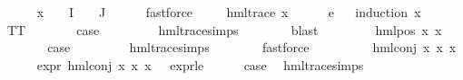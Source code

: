 \begin{isabellebody}
\ \ \ \ \isamarkupfalse%
\ {\isacartoucheopen}x\ {\isasymin}\ {\isacharparenleft}{\kern0pt}{\isasymPhi}\ {\isacharbackquote}{\kern0pt}\ I\ {\isasymunion}\ {\isasymPhi}\ {\isacharbackquote}{\kern0pt}\ J{\isacharparenright}{\kern0pt}{\isacartoucheclose}\isanewline
\ \ \ \ \isamarkupfalse%
\ fastforce\isanewline
\ \ \isamarkupfalse%
\ {\isachardoublequoteopen}\ hml{\isacharunderscore}{\kern0pt}trace\ x{\isachardoublequoteclose}\isanewline
\ \ \ \ \isamarkupfalse%
\ e{}\isanewline
\ \ \isamarkupfalse%
{\isacharparenleft}{\kern0pt}induction\ x{\isacharparenright}{\kern0pt}\isanewline
\ \ \ \ \isamarkupfalse%
\ TT\isanewline
\ \ \ \ \isamarkupfalse%
\ \isamarkupfalse%
\ {\isacharquery}{\kern0pt}case\ \isanewline
\ \ \ \ \ \ \isamarkupfalse%
\ hml{\isacharunderscore}{\kern0pt}trace{\isachardot}{\kern0pt}simps\isanewline
\ \ \ \ \ \ \isamarkupfalse%
\ blast\isanewline
\ \ \isamarkupfalse%
\isanewline
\ \ \ \ \isamarkupfalse%
\ {\isacharparenleft}{\kern0pt}hml{\isacharunderscore}{\kern0pt}pos\ x{}{}\ x{}{}{\isacharparenright}{\kern0pt}\isanewline
\ \ \ \ \isamarkupfalse%
\ \isamarkupfalse%
\ {\isacharquery}{\kern0pt}case\ \isanewline
\ \ \ \ \ \ \isamarkupfalse%
\ hml{\isacharunderscore}{\kern0pt}trace{\isachardot}{\kern0pt}simps\isanewline
\ \ \ \ \ \ \isamarkupfalse%
\ fastforce\ \isanewline
\ \ \isamarkupfalse%
\isanewline
\ \ \ \ \isamarkupfalse%
\ {\isacharparenleft}{\kern0pt}hml{\isacharunderscore}{\kern0pt}conj\ x{}{}\ x{}{}\ x{}{}{\isacharparenright}{\kern0pt}\isanewline
\ \ \ \ \isamarkupfalse%
\ {\isacartoucheopen}expr{\isacharunderscore}{\kern0pt}{}\ {\isacharparenleft}{\kern0pt}hml{\isacharunderscore}{\kern0pt}conj\ x{}{}\ x{}{}\ x{}{}{\isacharparenright}{\kern0pt}\ {\isasymle}\ {}{\isacartoucheclose}\ expr{\isacharunderscore}{\kern0pt}{}{\isacharunderscore}{\kern0pt}le{\isacharunderscore}{\kern0pt}{}\isanewline
\ \ \ \ \isamarkupfalse%
\ {\isacharquery}{\kern0pt}case\ \isamarkupfalse%
\ hml{\isacharunderscore}{\kern0pt}trace{\isachardot}{\kern0pt}simps\isanewline

\end{isabellebody}
